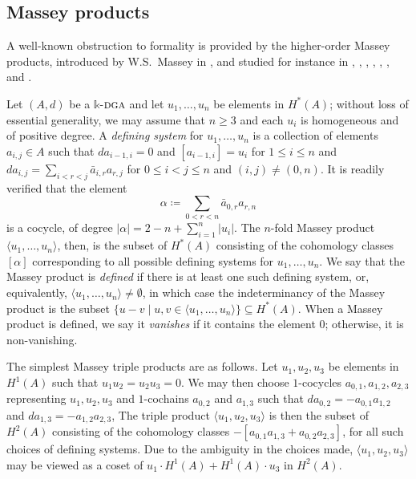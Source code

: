 \documentclass{article}
\numberwithin{equation}{section}
\theoremstyle{definition}
\renewcommand{\k}{\mathbb{k}}
\newcommand{\dga}{\ensuremath{\textsc{dga}}}
\newcommand{\abs}[1]{\left| #1 \right|}
\begin{document}
\subsection{Massey products}
\label{subsec:massey}
A well-known obstruction to formality is provided by the higher-order 
Massey products, introduced by W.S.~Massey in \cite{Ma-58}, and 
studied for instance in \cite{Kraines}, \cite{May}, \cite{Porter}, \cite{TO}, 
\cite{RT}, \cite{BT-2}, and \cite{Porter-Suciu-topappl}.  

Let $(A,d)$ be a $\k$-$\dga$ and let $u_1, \dots, u_n$ 
be elements in $H^{*}(A)$; without loss of essential generality, 
we may assume that $n\ge 3$ and each $u_i$ is homogeneous 
and of positive degree.  
A {\em defining system}\/ for $u_1, \dots, u_n$ is a collection 
of elements $a_{i,j}\in A$ such that 
$d a_{i-1,i}=0$ and $[a_{i-1,i}]=u_i$ for $1\le i\le n$ and 
$d a_{i,j}=\sum_{i<r<j} \bar{a}_{i,r} a_{r,j}$ for 
$0\le i<j\le n$ and $(i,j)\ne (0,n)$.
It is readily verified that the element 
\begin{equation}
\label{eq:massey-prod}
\alpha\coloneqq \sum_{0<r<n} \bar{a}_{0,r} a_{r,n}
\end{equation}
is a cocycle, of degree $\abs{\alpha}=2-n+\sum_{i=1}^{n} \abs{u_i}$. 
The $n$-fold Massey product $\langle u_1, \dots, u_n \rangle$, 
then, is the subset of $H^{*}(A)$ consisting of the cohomology classes 
$[\alpha]$ corresponding to all possible defining systems for $u_1, \dots, u_n$.
We say that the Massey product is {\em defined}\/ if there is at least one such 
defining system, or, equivalently, $\langle u_1, \dots, u_n \rangle\ne \emptyset$,  
in which case the indeterminancy of the Massey product is the subset 
$\{u-v\mid u,v\in \langle u_1, \dots, u_n \rangle\}\subseteq H^*(A)$.
When a Massey product is defined, we say it {\em vanishes}\/ if it contains 
the element $0$; otherwise, it is non-vanishing.

The simplest Massey triple products are as follows. 
Let $u_1, u_2, u_3$ be elements in $H^1(A)$ 
such that $u_1u_2 = u_2 u_3 = 0$. We may then choose 
$1$-cocycles $a_{0,1}, a_{1,2}, a_{2,3}$  representing $u_1, u_2, u_3$  
and $1$-cochains $a_{0,2}$ and $a_{1,3}$ such that 
$da_{0,2} = - a_{0,1} a_{1,2}$ and $da_{1,3} = - a_{1,2} a_{2,3}$, 
The triple product $\langle u_1,u_2, u_3 \rangle$ is then  
the subset of $H^2(A)$ consisting of the cohomology classes 
$-[a_{0,1} a_{1,3} + a_{0,2}a_{2,3}]$, for all such choices of 
defining systems. Due to the ambiguity in the choices made, 
$\langle u_1, u_2, u_3\rangle$ may be viewed as a coset 
of $u_1 \cdot H^1(A)+H^1(A)\cdot u_3$ in $H^2(A)$.
\end{document}
